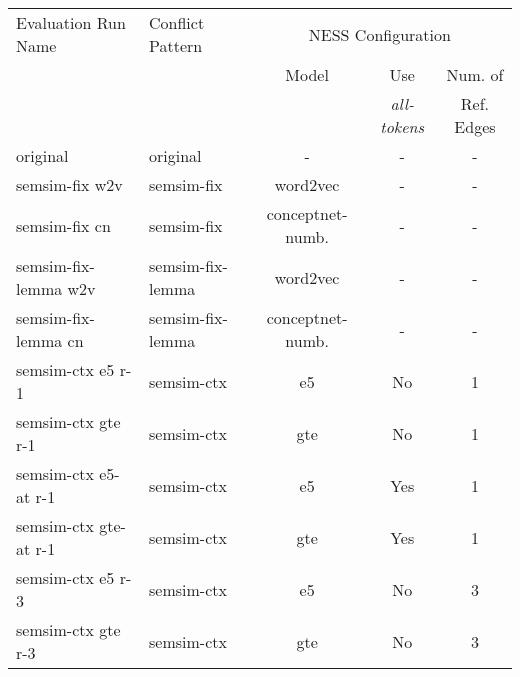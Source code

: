 \documentclass[11pt]{scrreprt}
\begin{document}
\begin{table}
\centering
\begin{tabular}{llccc}
\toprule
\multicolumn{1}{l}{Evaluation Run Name} & \multicolumn{1}{l}{Conflict Pattern} & \multicolumn{3}{c}{NESS Configuration} \\
\cmidrule{3-5}
\multicolumn{1}{l}{}   & \multicolumn{1}{l}{}  & \multicolumn{1}{c}{Model}	& \multicolumn{1}{c}{Use} & \multicolumn{1}{c}{Num. of} \\
\multicolumn{3}{l}{}   & \multicolumn{1}{c}{\textit{all-tokens}}  & \multicolumn{1}{c}{Ref. Edges}\\
\midrule
original                       & original                     & -                          & -                                         & - \\
semsim-fix w2v                 & semsim-fix                   & word2vec                   & -                                         & - \\
semsim-fix cn                 & semsim-fix                   & conceptnet-numb.                      & -                                         & - \\
semsim-fix-lemma w2v           & semsim-fix-lemma             & word2vec                   & -                                         & - \\
semsim-fix-lemma cn           & semsim-fix-lemma             & conceptnet-numb.                      & -                                         & - \\
semsim-ctx e5 r-1                & semsim-ctx                   & e5                         & No                                        & 1 \\
semsim-ctx gte r-1               & semsim-ctx                   & gte                        & No                                        & 1 \\
semsim-ctx e5-at r-1             & semsim-ctx                   & e5                         & Yes                                       & 1 \\
semsim-ctx gte-at r-1            & semsim-ctx                   & gte                        & Yes                                       & 1 \\
semsim-ctx e5 r-3                & semsim-ctx                   & e5                         & No                                        & 3 \\
semsim-ctx gte r-3               & semsim-ctx                   & gte                        & No                                        & 3 \\

\end{tabular}
\end{table}
\end{document}
